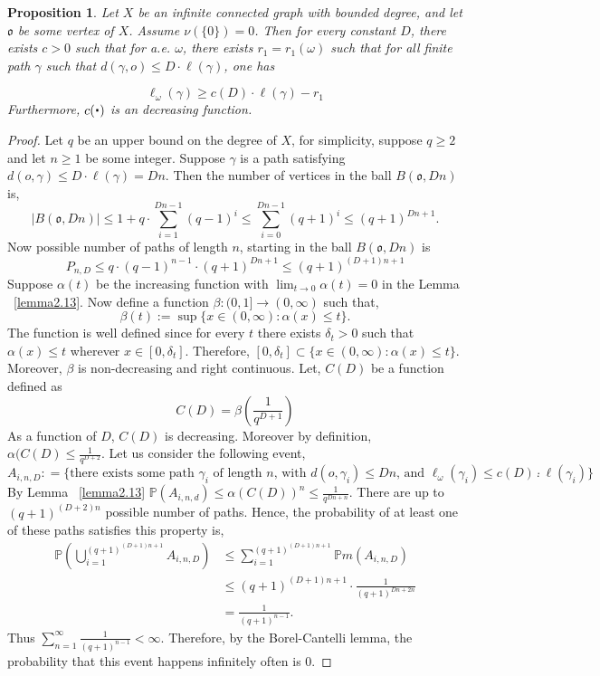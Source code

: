 \documentclass[12 pt]{amsart}
\newcommand{\gothic}{\mathfrak}
\newcommand{\go}{{\gothic o}}
\newtheorem{proposition}[theorem]{Proposition}
\theoremstyle{definition}
\theoremstyle{remark}
\newcommand{\param}{{\mathchoice{\mkern1mu\mbox{\raise2.2pt\hbox{$
  \centerdot$}}
  \mkern1mu}{\mkern1mu\mbox{\raise2.2pt\hbox{$\centerdot$}}\mkern1mu}{
  \mkern1.5mu\centerdot\mkern1.5mu}{\mkern1.5mu\centerdot\mkern1.5mu}}}
\begin{document}
\begin{proposition}\label{extension}\label{BT2}
 Let $X$ be an infinite connected graph with bounded degree, and let $\go$ be some vertex of $X$. Assume $\nu(\{0\})=0$. Then for every constant $D$, there exists $c>0$ such that for a.e. $\omega$, there exists $r_{1}=r_{1}(\omega)$ such that for all finite path $\gamma$ such that $d(\gamma, o) \leq D \cdot \ell(\gamma)$, one has

\[ \ell_\omega(\gamma)\geq c(D) \cdot \ell(\gamma)-r_{1}\]
Furthermore, $c(\param)$ is an decreasing function.
\end{proposition}
\begin{proof}
Let $q$ be an upper bound on the degree of $X$, for simplicity, suppose $q\geq 2$ and let $n\geq 1$ be some integer. Suppose $\gamma$ is a path satisfying $d(o,\gamma) \leq D \cdot \ell(\gamma) = Dn$. Then the number of vertices in the ball $B(\go, Dn)$ is, 
\[|B(\go, Dn)| \leq 1+q \cdot \displaystyle\sum_{i=1}^{Dn-1}(q-1)^{i}\leq \displaystyle\sum_{i=0}^{Dn-1}(q+1)^i \leq (q+1)^{Dn+1}.\]Now possible number of paths of length $n$, starting in the ball $B(\go,Dn)$ is \[P_{n,D} \leq q\cdot (q-1)^{n-1}\cdot (q+1)^{Dn+1} \leq (q+1)^{(D+1)n+1} \]
Suppose $\alpha(t)$ be the increasing function with $\lim_{t\to 0} \alpha(t)=0$ in the Lemma ~\ref{lemma2.13}. Now define a function $\beta:(0,1] \to (0,\infty)$ such that,
\[\beta(t):= \sup \{x \in(0,\infty) : \alpha(x) \leq t \}.\] 
The function  is well defined since for every $t$ there exists $\delta_t>0$ such that $\alpha(x) \leq t$ wherever $x \in [0,\delta_t]$. Therefore, $[0,\delta_t] \subset \{x \in(0,\infty) : \alpha(x) \leq t \}$. Moreover, $\beta$ is non-decreasing and right continuous. Let, $C(D)$ be a function defined as $$C(D)=\beta(\frac{1}{q^{D+1}})$$
As a function of $D$, $C(D)$ is decreasing. Moreover by definition, $\alpha(C(D)\leq \frac{1}{q^{D+2}}$. Let us consider the following event, 
\[
A_{i,n,D}: = \{ \text{there exists some path $\gamma_i$ of length $n$, with $d(o,\gamma_i) \leq Dn$, and $\ell_\omega(\gamma_i)\leq c(D)\cdot \ell(\gamma_i)$\}}.\] 
By Lemma ~\ref{lemma2.13} $\mathbb{P}(A_{i,n,d}) \leq \alpha(C(D))^n\leq \frac{1}{q^{Dn+n}}$. There are up to $(q+1)^{(D+2)n}$ possible number of paths. Hence, the probability of at least one of these paths satisfies this property is, 
\begin{align*}
\mathbb{P}\left(\bigcup_{i=1}^{(q+1)^{(D+1)n+1}} A_{i,n, D}\right) &\leq \sum_{i=1}^{(q+1)^{(D+1)n+1}} \mathbb{P}m(A_{i,n, D})\\
&\leq (q+1)^{(D+1)n+1} \cdot \frac{1}{(q+1)^{Dn+2n}} \\
&= \frac{1}{(q+1)^{n-1}}.
\end{align*}
Thus $ \sum_{n=1}^\infty \frac{1}{(q+1)^{n-1}} < \infty$. Therefore, by the Borel-Cantelli lemma, the probability that this event happens infinitely often is 0.
\end{proof}
\end{document}
